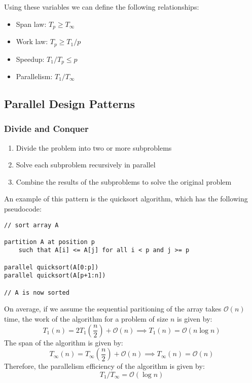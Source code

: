 \documentclass{article}
\begin{document}
Using these variables we can define the following relationships:
\begin{itemize}
    \item Span law: \(T_p \geqslant T_\infty\)
    \item Work law: \(T_p \geqslant T_1 / p\)
    \item Speedup: \(T_1 / T_p \leqslant p\)
    \item Parallelism: \(T_1 / T_\infty\)
\end{itemize}
\subsection{Parallel Design Patterns}
\subsubsection{Divide and Conquer}
\begin{enumerate}
    \item Divide the problem into two or more subproblems
    \item Solve each subproblem recursively in parallel
    \item Combine the results of the subproblems to solve the original
          problem
\end{enumerate}
An example of this pattern is the quicksort algorithm, which has the
following pseudocode:
\begin{verbatim}
// sort array A

partition A at position p
    such that A[i] <= A[j] for all i < p and j >= p

parallel quicksort(A[0:p])
parallel quicksort(A[p+1:n])

// A is now sorted
\end{verbatim}
On average, if we assume the sequential paritioning of the array takes
\(\mathcal{O}\left( n \right)\) time, the work of the algorithm for a
problem of size \(n\) is given by:
\begin{equation*}
    T_1\left( n \right) = 2T_1\left( \frac{n}{2} \right) + \mathcal{O}\left( n \right) \implies T_1\left( n \right) = \mathcal{O}\left( n \log n \right)
\end{equation*}
The span of the algorithm is given by:
\begin{equation*}
    T_\infty\left( n \right) = T_\infty\left( \frac{n}{2} \right) + \mathcal{O}\left( n \right) \implies T_\infty\left( n \right) = \mathcal{O}\left( n \right)
\end{equation*}
Therefore, the parallelism efficiency of the algorithm is given by:
\begin{equation*}
    T_1 / T_\infty = \mathcal{O}\left( \log n \right)
\end{equation*}
\end{document}
